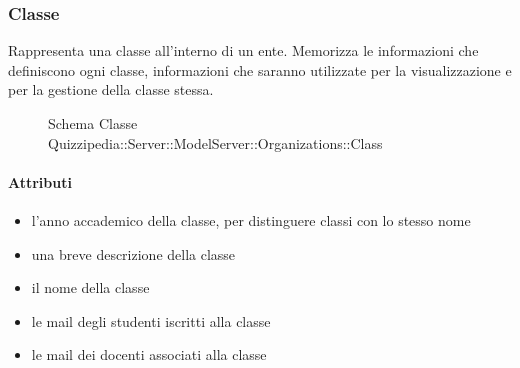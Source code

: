 \subsubsection{Classe }
Rappresenta una classe all'interno di un ente. Memorizza le informazioni che definiscono ogni classe,
informazioni che saranno utilizzate per la visualizzazione e per la gestione della classe stessa.
\begin{figure}[H]
\centering
\noindent{}
\caption[Schema Classe Class]{Schema Classe Quizzipedia::Server::ModelServer::Organizations::Class}
\end{figure}
\paragraph{Attributi}
\begin{itemize}
\item {}
\newline
l'anno accademico della classe, per distinguere classi con lo stesso nome
\item {}
\newline
una breve descrizione della classe
\item {}
\newline
il nome della classe
\item {}
\newline
le mail degli studenti iscritti alla classe
\item {}
\newline
le mail dei docenti associati alla classe
\end{itemize}
